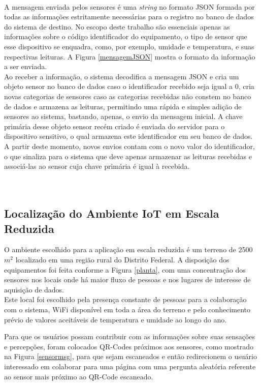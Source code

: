 \\\null \quad A mensagem enviada pelos sensores é uma \textit{string} no formato JSON formada por todas as informações estritamente necessárias para o registro no banco de dados do sistema de destino.
No escopo deste trabalho são essenciais apenas as informações sobre o código identificador do equipamento, o tipo de sensor que esse dispositivo se enquadra, como, por exemplo, umidade e temperatura, e suas respectivas leituras. A Figura \ref{mensagemJSON} mostra o formato da informação a ser enviada.
\\\null \quad Ao receber a informação, o sistema decodifica a mensagem JSON e cria um objeto sensor no banco de dados caso o identificador recebido seja igual a 0, cria novas categorias de sensores caso as categorias recebidas não constem no banco de dados e armazena as leituras, permitindo uma rápida e simples adição de sensores ao sistema, bastando, apenas, o envio da mensagem inicial. A chave primária desse objeto sensor recém criado é enviada do servidor para o dispositivo sensitivo, o qual armazena este identificador em seu banco de dados. A partir deste momento, novos envios contam com o novo valor do identificador, o que sinaliza para o sistema que deve apenas armazenar as leituras recebidas e associá-las ao sensor cuja chave primária é igual à recebida.
\\\\\\

\subsection{Localização do Ambiente IoT em Escala Reduzida}
\quad O ambiente escolhido para a aplicação em escala reduzida é um terreno de 2500 $m^2$ localizado em uma
região rural do Distrito Federal. A disposição dos equipamentos foi feita conforme a Figura \ref{planta},
com uma concentração dos sensores nos locais onde há maior fluxo de pessoas e nos lugares de interesse de
aquisição de dados.
\\\null \quad Este local foi escolhido pela presença constante de pessoas para a colaboração com o sistema, WiFi disponível em toda a área do terreno e pelo conhecimento prévio de valores aceitáveis de temperatura
  e umidade ao longo do ano.
\newpage

\newpage
Para que os usuários possam contribuir com as informações sobre suas sensações e percepções, foram colocados QR-Codes próximos aos sensores, como mostrado na Figura \ref{sensormsg}, para que sejam escaneados e então redirecionem o usuário interessado em colaborar para uma página com uma pergunta aleatória referente ao sensor mais próximo ao QR-Code escaneado.

